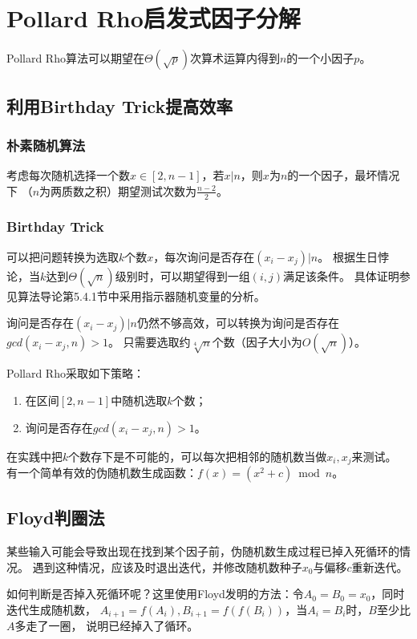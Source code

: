 \section{Pollard Rho启发式因子分解}
Pollard Rho算法可以期望在$\Theta(\sqrt{p})$次算术运算内得到$n$的一个小因子$p$。

\subsection{利用Birthday Trick提高效率}
\subsubsection{朴素随机算法}
考虑每次随机选择一个数$x\in [2,n-1]$，若$x|n$，则$x$为$n$的一个因子，最坏情况下
（$n$为两质数之积）期望测试次数为$\frac{n-2}{2}$。
\subsubsection{Birthday Trick}
可以把问题转换为选取$k$个数$x$，每次询问是否存在$(x_i-x_j)|n$。
根据生日悖论，当$k$达到$\Theta(\sqrt{n})$级别时，可以期望得到一组$(i,j)$满足该条件。
具体证明参见算法导论\cite{ITA3}第5.4.1节中采用指示器随机变量的分析。

询问是否存在$(x_i-x_j)|n$仍然不够高效，可以转换为询问是否存在$gcd(x_i-x_j,n)>1$。
只需要选取约$\sqrt[4]{n}$个数（因子大小为$O(\sqrt{n})$）。


Pollard Rho采取如下策略：
\begin{enumerate}
    \item 在区间$[2,n-1]$中随机选取$k$个数；
    \item 询问是否存在$gcd(x_i-x_j,n)>1$。
\end{enumerate}

在实践中把$k$个数存下是不可能的，可以每次把相邻的随机数当做$x_i,x_j$来测试。
有一个简单有效的伪随机数生成函数：$f(x)=(x^2+c) \bmod n$。

\subsection{Floyd判圈法}
某些输入可能会导致出现在找到某个因子前，伪随机数生成过程已掉入死循环的情况。
遇到这种情况，应该及时退出迭代，并修改随机数种子$x_0$与偏移$c$重新迭代。

如何判断是否掉入死循环呢？这里使用Floyd发明的方法：令$A_0=B_0=x_0$，同时迭代生成随机数，
$A_{i+1}=f(A_i),B_{i+1}=f(f(B_i))$，当$A_i=B_i$时，$B$至少比$A$多走了一圈，
说明已经掉入了循环。


